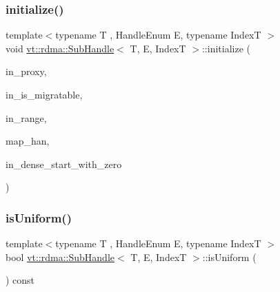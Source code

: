 \mbox{\label{structvt_1_1rdma_1_1_sub_handle_aedc4c6df2e9a471ac5d79c390a880757}} 
\subsubsection{\texorpdfstring{initialize()}{initialize()}}
{\footnotesize\ttfamily template$<$typename T , Handle\+Enum E, typename IndexT $>$ \\
void \hyperlink{structvt_1_1rdma_1_1_sub_handle}{vt\+::rdma\+::\+Sub\+Handle}$<$ T, E, IndexT $>$\+::initialize (\begin{DoxyParamCaption}\item[{\hyperlink{structvt_1_1rdma_1_1_sub_handle_a758bee2e499658cfef92ace83eea6590}{Proxy\+Type}}]{in\+\_\+proxy,  }\item[{bool}]{in\+\_\+is\+\_\+migratable,  }\item[{IndexT}]{in\+\_\+range,  }\item[{\hyperlink{namespacevt_af64846b57dfcaf104da3ef6967917573}{vt\+::\+Handler\+Type}}]{map\+\_\+han,  }\item[{bool}]{in\+\_\+dense\+\_\+start\+\_\+with\+\_\+zero }\end{DoxyParamCaption})}

\mbox{\label{structvt_1_1rdma_1_1_sub_handle_a8c6c6c237a31ecd12ec9fa5e875b20a7}} 
\subsubsection{\texorpdfstring{is\+Uniform()}{isUniform()}}
{\footnotesize\ttfamily template$<$typename T , Handle\+Enum E, typename IndexT $>$ \\
bool \hyperlink{structvt_1_1rdma_1_1_sub_handle}{vt\+::rdma\+::\+Sub\+Handle}$<$ T, E, IndexT $>$\+::is\+Uniform (\begin{DoxyParamCaption}{ }\end{DoxyParamCaption}) const\hspace{0.3cm}{\ttfamily [inline]}}

\mbox{\label{structvt_1_1rdma_1_1_sub_handle_a35569a5d08c05d25f56136f5924e4315}} 
